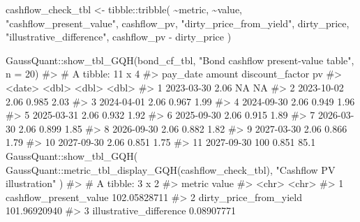 \documentclass[
  letterpaper,
  DIV=11,
  numbers=noendperiod]{scrreprt}
\newenvironment{Shaded}{\begin{snugshade}}{\end{snugshade}}
\newcommand{\AttributeTok}[1]{\textcolor[rgb]{0.40,0.45,0.13}{#1}}
\newcommand{\CommentTok}[1]{\textcolor[rgb]{0.37,0.37,0.37}{#1}}
\newcommand{\DecValTok}[1]{\textcolor[rgb]{0.68,0.00,0.00}{#1}}
\newcommand{\FunctionTok}[1]{\textcolor[rgb]{0.28,0.35,0.67}{#1}}
\newcommand{\NormalTok}[1]{\textcolor[rgb]{0.00,0.23,0.31}{#1}}
\newcommand{\OtherTok}[1]{\textcolor[rgb]{0.00,0.23,0.31}{#1}}
\newcommand{\SpecialCharTok}[1]{\textcolor[rgb]{0.37,0.37,0.37}{#1}}
\newcommand{\StringTok}[1]{\textcolor[rgb]{0.13,0.47,0.30}{#1}}
\begin{document}
\begin{Shaded}
\begin{Highlighting}[]
\NormalTok{cashflow\_check\_tbl }\OtherTok{\textless{}{-}}\NormalTok{ tibble}\SpecialCharTok{::}\FunctionTok{tribble}\NormalTok{(}
  \SpecialCharTok{\textasciitilde{}}\NormalTok{metric, }\SpecialCharTok{\textasciitilde{}}\NormalTok{value,}
  \StringTok{"cashflow\_present\_value"}\NormalTok{, cashflow\_pv,}
  \StringTok{"dirty\_price\_from\_yield"}\NormalTok{, dirty\_price,}
  \StringTok{"illustrative\_difference"}\NormalTok{, cashflow\_pv }\SpecialCharTok{{-}}\NormalTok{ dirty\_price}
\NormalTok{)}

\NormalTok{GaussQuant}\SpecialCharTok{::}\FunctionTok{show\_tbl\_GQH}\NormalTok{(bond\_cf\_tbl, }\StringTok{"Bond cashflow present{-}value table"}\NormalTok{, }\AttributeTok{n =} \DecValTok{20}\NormalTok{)}
\CommentTok{\#\textgreater{} \# A tibble: 11 x 4}
\CommentTok{\#\textgreater{}    pay\_date   amount discount\_factor    pv}
\CommentTok{\#\textgreater{}    \textless{}date\textgreater{}      \textless{}dbl\textgreater{}           \textless{}dbl\textgreater{} \textless{}dbl\textgreater{}}
\CommentTok{\#\textgreater{}  1 2023{-}03{-}30   2.06          NA     NA   }
\CommentTok{\#\textgreater{}  2 2023{-}10{-}02   2.06           0.985  2.03}
\CommentTok{\#\textgreater{}  3 2024{-}04{-}01   2.06           0.967  1.99}
\CommentTok{\#\textgreater{}  4 2024{-}09{-}30   2.06           0.949  1.96}
\CommentTok{\#\textgreater{}  5 2025{-}03{-}31   2.06           0.932  1.92}
\CommentTok{\#\textgreater{}  6 2025{-}09{-}30   2.06           0.915  1.89}
\CommentTok{\#\textgreater{}  7 2026{-}03{-}30   2.06           0.899  1.85}
\CommentTok{\#\textgreater{}  8 2026{-}09{-}30   2.06           0.882  1.82}
\CommentTok{\#\textgreater{}  9 2027{-}03{-}30   2.06           0.866  1.79}
\CommentTok{\#\textgreater{} 10 2027{-}09{-}30   2.06           0.851  1.75}
\CommentTok{\#\textgreater{} 11 2027{-}09{-}30 100              0.851 85.1}
\NormalTok{GaussQuant}\SpecialCharTok{::}\FunctionTok{show\_tbl\_GQH}\NormalTok{(}
\NormalTok{  GaussQuant}\SpecialCharTok{::}\FunctionTok{metric\_tbl\_display\_GQH}\NormalTok{(cashflow\_check\_tbl),}
  \StringTok{"Cashflow PV illustration"}
\NormalTok{)}
\CommentTok{\#\textgreater{} \# A tibble: 3 x 2}
\CommentTok{\#\textgreater{}   metric                  value       }
\CommentTok{\#\textgreater{}   \textless{}chr\textgreater{}                   \textless{}chr\textgreater{}       }
\CommentTok{\#\textgreater{} 1 cashflow\_present\_value  102.05828711}
\CommentTok{\#\textgreater{} 2 dirty\_price\_from\_yield  101.96920940}
\CommentTok{\#\textgreater{} 3 illustrative\_difference 0.08907771}
\end{Highlighting}
\end{Shaded}
\end{document}
